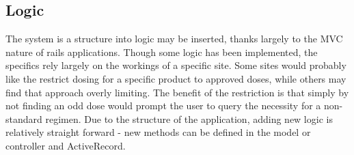 \documentclass[letterpaper]{amsart}
\begin{document}
\subsection{Logic}
The system is a structure into logic may be inserted, thanks largely to the MVC nature of rails applications.  Though some logic has been implemented, the specifics rely largely on the workings of a specific site.  Some sites would probably like the restrict dosing for a specific product to approved doses, while others may find that approach overly limiting.  The benefit of the restriction is that simply by not finding an odd dose would prompt the user to query the necessity for a non-standard regimen.
Due to the structure of the application, adding new logic is relatively straight forward - new methods can be defined in the model or controller and ActiveRecord. 

\begin{comment}
    Appendices:
    Example of model code generation for pigyard

\end{comment}
\end{document}
